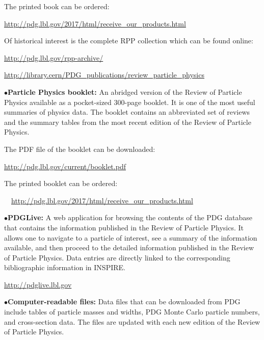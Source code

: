 \item{} The printed book can be ordered:

         \item{}\quad\url{http://pdg.lbl.gov/2017/html/receive_our_products.html}

\item{} Of historical interest is the complete RPP collection which can be found online:

         \item{}\quad\url{http://pdg.lbl.gov/rpp-archive/}
         \item{}\quad\url{http://library.cern/PDG_publications/review_particle_physics}


\item{$\bullet$}{\bf Particle Physics booklet:}
An abridged version of the Review of Particle Physics available as a pocket-sized
300-page booklet. It is one of the most useful summaries
of physics data. The booklet contains an abbreviated set of reviews and the summary
tables from the most recent edition of the Review of Particle Physics.

\item{} The PDF file of the booklet can be downloaded:

         \item{}\qquad\url{http://pdg.lbl.gov/current/booklet.pdf}

\item{} The printed booklet can be ordered:

         \item{}~~\url{http://pdg.lbl.gov/2017/html/receive_our_products.html}


\medskip

\item{$\bullet$}{\bf PDGLive:}
A web application for browsing the contents of the PDG database that contains the information published in the Review of Particle Physics. It allows one to navigate to a particle of interest, see a summary of the information available, and then proceed to the detailed information published in the Review of Particle Physics. Data entries are directly linked to the corresponding bibliographic information in INSPIRE.

    \item{}\qquad\url{http://pdglive.lbl.gov}


\medskip

\item{$\bullet$}{\bf Computer-readable files:}
Data files that can be downloaded from PDG include tables of particle masses and widths, PDG Monte Carlo particle numbers, and cross-section data. The files are updated with each new edition of the Review of Particle Physics.

